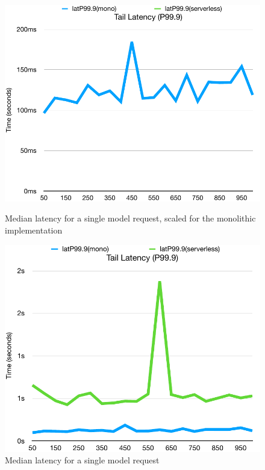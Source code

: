 \begin{figure}[h!]
    \centering
    \begin{minipage}{0.48\textwidth}
        \centering
        \includegraphics[width=\linewidth]{media/rl100_tl_mono.pdf}
        \caption{Median latency for a single model request, scaled for the monolithic implementation}
        \label{fig:rate_unlimited_comparison_lat_mono}
    \end{minipage}\hfill
    \begin{minipage}{0.48\textwidth}
        \centering
        \includegraphics[width=\linewidth]{media/rl100_tl.pdf}
        \caption{Median latency for a single model request}
        \label{fig:rate_unlimited_comparison_lat}
    \end{minipage}
\end{figure}

